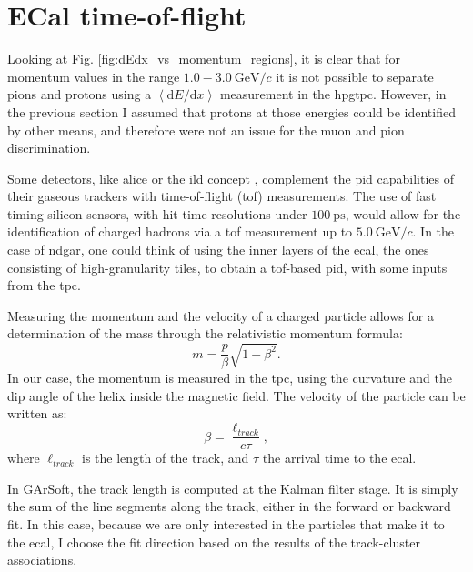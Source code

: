 \section{ECal time-of-flight}\label{section:tof}

Looking at Fig. \ref{fig:dEdx_vs_momentum_regions}, it is clear that for momentum values in the range $1.0-3.0 ~ \mathrm{GeV}/c$ it is not possible to separate pions and protons using a $\left<\mathrm{d}E/\mathrm{d}x\right>$ measurement in the \gls{hpgtpc}. However, in the previous section I assumed that protons at those energies could be identified by other means, and therefore were not an issue for the muon and pion discrimination.

Some detectors, like \gls{alice} \cite{ALICE2011} or the \gls{ild} concept \cite{Einhaus2021}, complement the \gls{pid} capabilities of their gaseous trackers with time-of-flight (\gls{tof}) measurements. The use of fast timing silicon sensors, with hit time resolutions under $100~\mathrm{ps}$, would allow for the identification of charged hadrons via a \gls{tof} measurement up to $5.0 ~ \mathrm{GeV}/c$. In the case of \gls{ndgar}, one could think of using the inner layers of the \gls{ecal}, the ones consisting of high-granularity tiles, to obtain a \gls{tof}-based \gls{pid}, with some inputs from the \gls{tpc}.

Measuring the momentum and the velocity of a charged particle allows for a determination of the mass through the relativistic momentum formula:
\begin{equation}\label{8.19}
	m = \frac{p}{\beta} \sqrt{1-\beta^{2}}.
\end{equation}
In our case, the momentum is measured in the \gls{tpc}, using the curvature and the dip angle of the helix inside the magnetic field. The velocity of the particle can be written as:
\begin{equation}
	\beta = \frac{\ell_{track}}{c \tau},
\end{equation}
where $\ell_{track}$ is the length of the track, and $\tau$ the arrival time to the \gls{ecal}.

In GArSoft, the track length is computed at the Kalman filter stage. It is simply the sum of the line segments along the track, either in the forward or backward fit. In this case, because we are only interested in the particles that make it to the \gls{ecal}, I choose the fit direction based on the results of the track-cluster associations.

